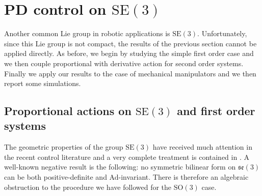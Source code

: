 \documentclass[10pt,twocolumn]{article}
\newcommand{\SO}{\mathrm{SO}}
\newcommand{\SE}{\mathrm{SE}}
\newcommand{\se}{\mathfrak{se}}
\begin{document}
\section{PD control on $\SE(3)$}\label{sec:pd-se3}
Another common Lie group in robotic applications is $\SE(3)$. Unfortunately, since this Lie group is not compact, the results of the previous section cannot be applied directly. As before, we begin by studying the simple first order case and we then couple proportional with derivative action for second order systems. Finally we apply our results to the case of mechanical manipulators and we then report some simulations.

\subsection{Proportional actions on $\SE(3)$ and first order systems}\label{subsec:proportional-se3}
The geometric properties of the group $\SE(3)$ have received much attention in the recent control literature \cite{3,1} and a very complete treatment is contained in \cite{15}. A well-known negative result is the following: no symmetric bilinear form on $\se(3)$ can be both positive-definite and Ad-invariant. There is therefore an algebraic obstruction to the procedure we have followed for the $\SO(3)$ case.
\end{document}
